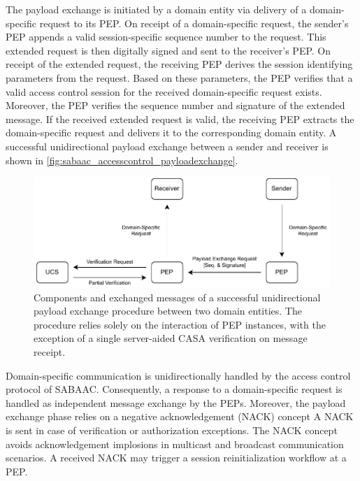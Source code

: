\begin{description}
    The payload exchange is initiated by a domain entity via delivery of a domain-specific request to its PEP.
    On receipt of a domain-specific request, the sender's PEP appends a valid session-specific sequence number to the request.
    This extended request is then digitally signed and sent to the receiver's PEP.
    On receipt of the extended request, the receiving PEP derives the session identifying parameters from the request.
    Based on these parameters, the PEP verifies that a valid access control session for the received domain-specific request exists.
    Moreover, the PEP verifies the sequence number and signature of the extended message.
    If the received extended request is valid, the receiving PEP extracts the domain-specific request and delivers it to the corresponding domain entity.
    A successful unidirectional payload exchange between a sender and receiver is shown in \autoref{fig:sabaac_accesscontrol_payloadexchange}.
    \begin{figure}
        \centering
        \includegraphics[width=1.0\linewidth]{figures/SABAAC_protocols_accesscontrol_payloadexchange.drawio.pdf}
        \caption{Components and exchanged messages of a successful unidirectional payload exchange procedure between two domain entities. The procedure relies solely on the interaction of PEP instances, with the exception of a single server-aided CASA verification on message receipt.}
        \label{fig:sabaac_accesscontrol_payloadexchange}
    \end{figure}
    
    Domain-specific communication is unidirectionally handled by the access control protocol of SABAAC.
    Consequently, a response to a domain-specific request is handled as independent message exchange by the PEPs.
    Moreover, the payload exchange phase relies on a negative acknowledgement (NACK) concept
    A NACK is sent in case of verification or authorization exceptions.
    The NACK concept avoids acknowledgement implosions in multicast and broadcast communication scenarios.
    A received NACK may trigger a session reinitialization workflow at a PEP.


\end{description}
